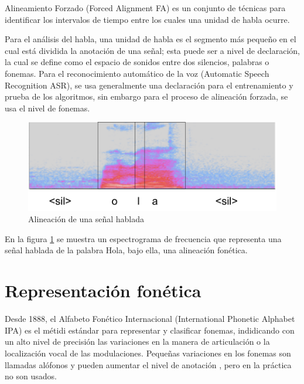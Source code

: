 Alineamiento Forzado (Forced Alignment FA) es un conjunto de técnicas para identificar los intervalos de tiempo entre los cuales una unidad de habla ocurre.

Para el análisis del habla, una unidad de habla es el segmento más pequeño en el cual está dividida la anotación de una señal; esta puede ser a nivel de declaración, la cual se define como el espacio de sonidos entre dos silencios, palabras o fonemas. Para el reconocimiento automático de la voz (Automatic Speech Recognition ASR), se usa generalmente una declaración para el entrenamiento y prueba de los algoritmos, sin embargo para el proceso de alineación forzada, se usa el nivel de fonemas.

\begin{figure}[H]

\centering
\caption{Alineación de una señal hablada}
\label{img:alignment}
\includegraphics[scale=0.50]{images/alignment.png}
\end{figure}

En la figura \ref{img:alignment} se muestra un espectrograma de frecuencia que representa una señal hablada de la palabra Hola, bajo ella, una alineación fonética.

\section{Representación fonética}

Desde 1888, el Alfabeto Fonético Internacional (International Phonetic Alphabet IPA) es el métidi estándar para representar y clasificar fonemas, indidicando con un alto nivel de precisión las variaciones en la manera de articulación o la localización vocal de las modulaciones. Pequeñas variaciones en los fonemas son llamadas alófonos y pueden aumentar el nivel de anotación  \cite{IPAAlphabet}, pero en la práctica no son usados.

